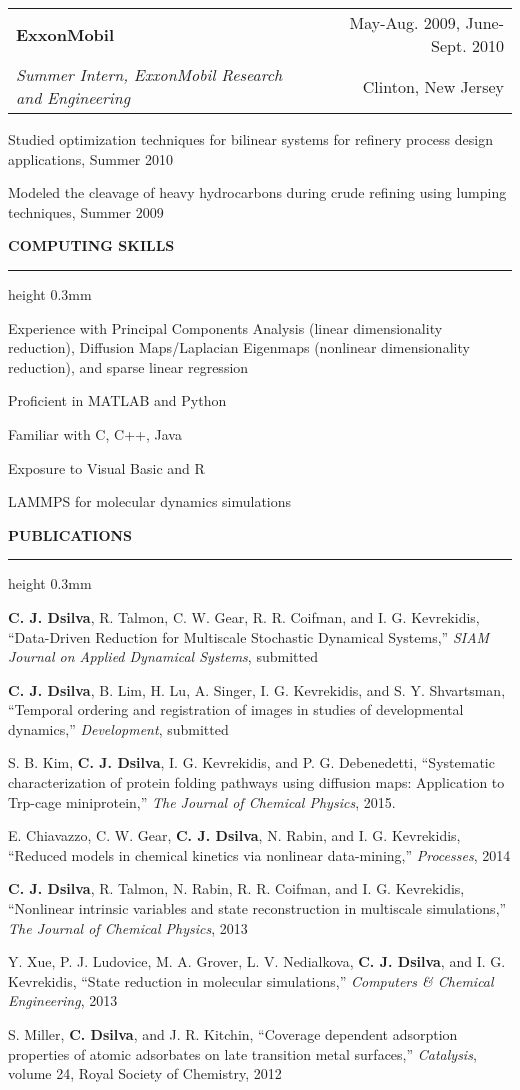 \documentclass[letterpaper,10pt]{article}
\makeatletter
\newenvironment{itemize*}
  {\begin{itemize}
    \setlength{\parskip}{-2pt}}
  {\end{itemize}}
\newcommand{\cvheading}[1]{
\vspace{0.11in}
\noindent
\MakeUppercase{\bf #1}
\vspace{0.06in}
{\hrule height 0.3mm}
\vspace{0.06in}}
\newcommand{\workplace}[4]{
\noindent
\vspace{0.012in}
\begin{tabular*}{1.0\textwidth}{@{\extracolsep{\fill}} l r}
{\bf #1} & #2\\
{\em #3} & #4\\
\end{tabular*}
\vspace{-0.15in}
}
\makeatother
\begin{document}
\workplace{ExxonMobil}{May-Aug. 2009, June-Sept. 2010}{Summer Intern, ExxonMobil Research and Engineering}{Clinton, New Jersey}
\begin{itemize*}
\item Studied optimization techniques for bilinear systems for refinery process design applications, Summer 2010
\item Modeled the cleavage of heavy hydrocarbons during crude refining using lumping techniques, Summer 2009
\end{itemize*}

\cvheading{Computing Skills}
\begin{itemize*}
\item Experience with Principal Components Analysis (linear dimensionality reduction), Diffusion Maps/Laplacian Eigenmaps (nonlinear dimensionality reduction), and sparse linear regression
\item Proficient in MATLAB and Python
\item Familiar with C, C++, Java
\item Exposure to Visual Basic and R
\item LAMMPS for molecular dynamics simulations
\end{itemize*}


\cvheading{Publications}
\begin{itemize*}
\item {\bf C. J. Dsilva}, R. Talmon, C. W. Gear, R. R. Coifman, and I. G. Kevrekidis, ``Data-Driven Reduction for Multiscale Stochastic Dynamical Systems,'' {\em SIAM Journal on Applied Dynamical Systems}, submitted
\item {\bf C. J. Dsilva}, B. Lim, H. Lu, A. Singer, I. G. Kevrekidis, and S. Y. Shvartsman, ``Temporal ordering and registration of images in studies of developmental dynamics,'' {\em Development}, submitted
\item S. B. Kim, {\bf C. J. Dsilva}, I. G. Kevrekidis, and P. G. Debenedetti, ``Systematic characterization of protein folding pathways using diffusion maps: Application to Trp-cage miniprotein,'' {\em The Journal of Chemical Physics}, 2015. 
\item E. Chiavazzo, C. W. Gear, {\bf C. J. Dsilva}, N. Rabin, and I. G. Kevrekidis, ``Reduced models in chemical kinetics via nonlinear data-mining,'' {\em Processes}, 2014
\item {\bf C. J. Dsilva}, R. Talmon, N. Rabin, R. R. Coifman, and I. G. Kevrekidis, ``Nonlinear intrinsic variables and state reconstruction in multiscale simulations,''
{\em The Journal of Chemical Physics}, 2013
\item Y. Xue, P. J. Ludovice, M. A. Grover, L. V. Nedialkova, {\bf C. J. Dsilva}, and I. G. Kevrekidis, ``State reduction in molecular simulations,'' {\em Computers \& Chemical Engineering}, 2013
\item S. Miller, {\bf C. Dsilva}, and J. R. Kitchin, ``Coverage dependent adsorption properties of atomic adsorbates on late transition metal surfaces,'' {\em Catalysis}, volume 24, Royal Society of Chemistry, 2012
\end{itemize*}
\end{document}
